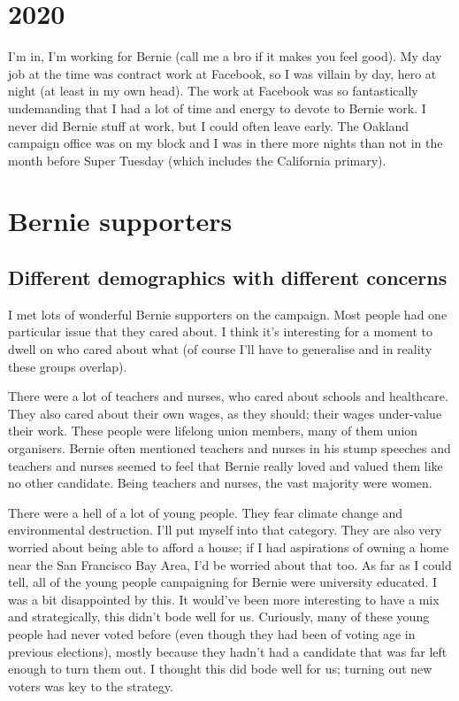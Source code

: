 \documentclass[]{book}
\begin{document}
\hypertarget{section-2}{%
\chapter{2020}\label{section-2}}

I'm in, I'm working for Bernie (call me a bro if it makes you feel good). My day job at the time was contract work at Facebook, so I was villain by day, hero at night (at least in my own head). The work at Facebook was so fantastically undemanding that I had a lot of time and energy to devote to Bernie work. I never did Bernie stuff at work, but I could often leave early. The Oakland campaign office was on my block and I was in there more nights than not in the month before Super Tuesday (which includes the California primary).

\hypertarget{bernie-supporters}{%
\chapter{Bernie supporters}\label{bernie-supporters}}

\hypertarget{different-demographics-with-different-concerns}{%
\section{Different demographics with different concerns}\label{different-demographics-with-different-concerns}}

I met lots of wonderful Bernie supporters on the campaign. Most people had one particular issue that they cared about. I think it's interesting for a moment to dwell on who cared about what (of course I'll have to generalise and in reality these groups overlap).

There were a lot of teachers and nurses, who cared about schools and healthcare. They also cared about their own wages, as they should; their wages under-value their work. These people were lifelong union members, many of them union organisers. Bernie often mentioned teachers and nurses in his stump speeches and teachers and nurses seemed to feel that Bernie really loved and valued them like no other candidate. Being teachers and nurses, the vast majority were women.

There were a hell of a lot of young people. They fear climate change and environmental destruction. I'll put myself into that category. They are also very worried about being able to afford a house; if I had aspirations of owning a home near the San Francisco Bay Area, I'd be worried about that too. As far as I could tell, all of the young people campaigning for Bernie were university educated. I was a bit disappointed by this. It would've been more interesting to have a mix and strategically, this didn't bode well for us. Curiously, many of these young people had never voted before (even though they had been of voting age in previous elections), mostly because they hadn't had a candidate that was far left enough to turn them out. I thought this did bode well for us; turning out new voters was key to the strategy.
\end{document}
